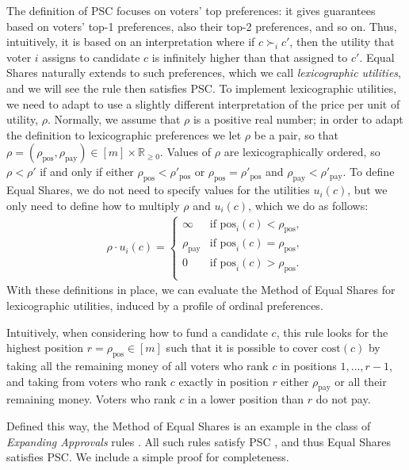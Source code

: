 \documentclass[10pt]{scrartcl}
\renewcommand*{\ge}{\geqslant}
\newcommand{\cost}{{{\mathrm{cost}}}}
\theoremstyle{definition}
\theoremstyle{plain}
\newcommand{\pos}{{{{\mathrm{pos}}}}}
\begin{document}
The definition of PSC focuses on voters' top preferences: it gives guarantees based on voters' top-1 preferences, also their top-2 preferences, and so on. Thus, intuitively, it is based on an interpretation where if $c \succ_i c'$, then the utility that voter $i$ assigns to candidate $c$ is infinitely higher than that assigned to $c'$. Equal Shares naturally extends to such preferences, which we call \emph{lexicographic utilities}, and we will see the rule then satisfies PSC. To implement lexicographic utilities, we need to adapt  to use a slightly different interpretation of the price per unit of utility, $\rho$. Normally, we assume that $\rho$ is a positive real number; in order to adapt the definition to lexicographic preferences we let $\rho$ be a pair, so that $\rho = (\rho_{\text{pos}}, \rho_{\text{pay}}) \in [m] \times \mathbb R_{\ge 0}$. Values of $\rho$ are lexicographically ordered, so $\rho < \rho'$ if and only if either $\rho_{\text{pos}} < \rho'_{\text{pos}}$ or $\rho_{\text{pos}} = \rho'_{\text{pos}}$ and $\rho_{\text{pay}} < \rho'_{\text{pay}}$. To define Equal Shares, we do not need to specify values for the utilities $u_i(c)$, but we only need to define how to multiply $\rho$ and $u_i(c)$, which we do as follows:
\begin{align*}
	\rho \cdot u_i(c) =
	\begin{cases} 
		\infty & \text{if } \pos_i(c) < \rho_{\text{pos}}, \\
		\rho_{\text{pay}} & \text{if } \pos_i(c) = \rho_{\text{pos}}, \\
		0 & \text{if } \pos_i(c) > \rho_{\text{pos}}. \\
	\end{cases} 
\end{align*}
With these definitions in place, we can evaluate the Method of Equal Shares for lexicographic utilities, induced by a profile of ordinal preferences.

Intuitively, when considering how to fund a candidate $c$, this rule looks for the highest position $r = \rho_{\text{pos}} \in [m]$ such that it is possible to cover $\cost(c)$ by taking all the remaining money of all voters who rank $c$ in positions $1, \dots, r-1$, and taking from voters who rank $c$ exactly in position $r$ either $\rho_{\text{pay}}$ or all their remaining money. Voters who rank $c$ in a lower position than $r$ do not pay.

Defined this way, the Method of Equal Shares is an example in the class of \emph{Expanding Approvals} rules \citep{az-bar:expanding_approval,aziz2021proportionally}. All such rules satisfy PSC \citep{aziz2021proportionally}, and thus Equal Shares satisfies PSC. We include a simple proof for completeness.
\end{document}
